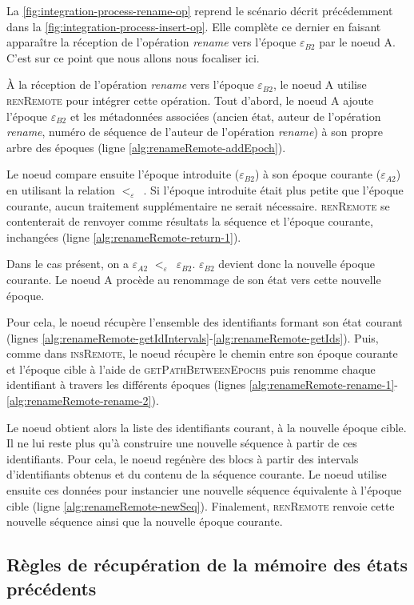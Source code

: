\documentclass[12pt]{thesul}
\newcommand{\epoch}[1]{$\varepsilon_{#1}$}
\newcommand{\lepoch}{$<_{\varepsilon}$~}
\begin{document}
La \autoref{fig:integration-process-rename-op} reprend le scénario décrit précédemment dans la \autoref{fig:integration-process-insert-op}.
Elle complète ce dernier en faisant apparaître la réception de l'opération \emph{rename} vers l'époque \epoch{B2} par le noeud A.
C'est sur ce point que nous allons nous focaliser ici.

À la réception de l'opération \emph{rename} vers l'époque \epoch{B2}, le noeud A utilise \textsc{renRemote} pour intégrer cette opération.
Tout d'abord, le noeud A ajoute l'époque \epoch{B2} et les métadonnées associées (ancien état, auteur de l'opération \emph{rename}, numéro de séquence de l'auteur de l'opération \emph{rename}) à son propre arbre des époques (ligne \ref{alg:renameRemote-addEpoch}).

Le noeud compare ensuite l'époque introduite (\epoch{B2}) à son époque courante (\epoch{A2}) en utilisant la relation \lepoch.
Si l'époque introduite était plus petite que l'époque courante, aucun traitement supplémentaire ne serait nécessaire.
\textsc{renRemote} se contenterait de renvoyer comme résultats la séquence et l'époque courante, inchangées (ligne \ref{alg:renameRemote-return-1}).

Dans le cas présent, on a \epoch{A2} \lepoch \epoch{B2}.
\epoch{B2} devient donc la nouvelle époque courante.
Le noeud A procède au renommage de son état vers cette nouvelle époque.

Pour cela, le noeud récupère l'ensemble des identifiants formant son état courant (lignes \ref{alg:renameRemote-getIdIntervals}-\ref{alg:renameRemote-getIds}).
Puis, comme dans \textsc{insRemote}, le noeud récupère le chemin entre son époque courante et l'époque cible à l'aide de \textsc{getPathBetweenEpochs} puis renomme chaque identifiant à travers les différents époques (lignes \ref{alg:renameRemote-rename-1}-\ref{alg:renameRemote-rename-2}).

Le noeud obtient alors la liste des identifiants courant, à la nouvelle époque cible.
Il ne lui reste plus qu'à construire une nouvelle séquence à partir de ces identifiants.
Pour cela, le noeud regénère des blocs à partir des intervals d'identifiants obtenus et du contenu de la séquence courante.
Le noeud utilise ensuite ces données pour instancier une nouvelle séquence équivalente à l'époque cible (ligne \ref{alg:renameRemote-newSeq}).
Finalement, \textsc{renRemote} renvoie cette nouvelle séquence ainsi que la nouvelle époque courante.

\subsection{Règles de récupération de la mémoire des états précédents}
\end{document}
